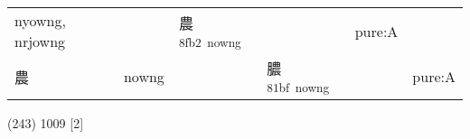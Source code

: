 \documentclass[14pt,a4paper]{scrartcl}
\begin{document}
\begin{longtable}[c]{@{}llllll@{}}
\begin{minipage}[t]{0.14\columnwidth}\raggedright\strut
nyowng, nrjowng
\strut\end{minipage} &
\begin{minipage}[t]{0.14\columnwidth}\raggedright\strut
\strut\end{minipage} &
\begin{minipage}[t]{0.14\columnwidth}\raggedright\strut
農\textsuperscript{8fb2~nowng}
\strut\end{minipage} &
\begin{minipage}[t]{0.14\columnwidth}\raggedright\strut
\strut\end{minipage} &
\begin{minipage}[t]{0.14\columnwidth}\raggedright\strut
pure:A
\strut\end{minipage}\tabularnewline
\begin{minipage}[t]{0.14\columnwidth}\raggedright\strut
農
\strut\end{minipage} &
\begin{minipage}[t]{0.14\columnwidth}\raggedright\strut
nowng
\strut\end{minipage} &
\begin{minipage}[t]{0.14\columnwidth}\raggedright\strut
\strut\end{minipage} &
\begin{minipage}[t]{0.14\columnwidth}\raggedright\strut
膿\textsuperscript{81bf~nowng}
\strut\end{minipage} &
\begin{minipage}[t]{0.14\columnwidth}\raggedright\strut
\strut\end{minipage} &
\begin{minipage}[t]{0.14\columnwidth}\raggedright\strut
pure:A
\strut\end{minipage}\tabularnewline
\bottomrule
\end{longtable}

(243) 1009 {[}2{]}
\end{document}
